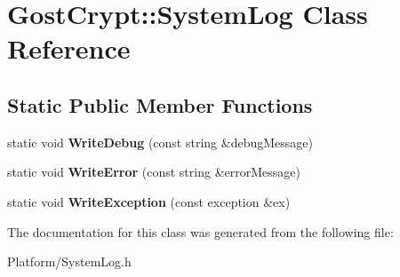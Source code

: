 \hypertarget{class_gost_crypt_1_1_system_log}{}\section{Gost\+Crypt\+:\+:System\+Log Class Reference}
\label{class_gost_crypt_1_1_system_log}
\subsection*{Static Public Member Functions}
\begin{DoxyCompactItemize}
\item 
\mbox{\label{class_gost_crypt_1_1_system_log_a19b820cdb0773a4ecea6b8a0cb19e014}} 
static void {\bfseries Write\+Debug} (const string \&debug\+Message)
\item 
\mbox{\label{class_gost_crypt_1_1_system_log_a4b3fe5da18e8a233be8c78cfaaa4efc4}} 
static void {\bfseries Write\+Error} (const string \&error\+Message)
\item 
\mbox{\label{class_gost_crypt_1_1_system_log_a5ecfdcedc06ffef053bce19c7c592cfc}} 
static void {\bfseries Write\+Exception} (const exception \&ex)
\end{DoxyCompactItemize}


The documentation for this class was generated from the following file\+:\begin{DoxyCompactItemize}
\item 
Platform/System\+Log.\+h\end{DoxyCompactItemize}
